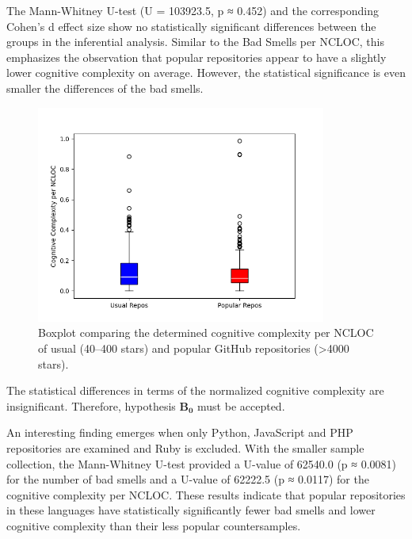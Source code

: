 \documentclass[a4paper, 12pt]{article}
\begin{document}
The Mann-Whitney U-test (U = 103923.5, p ≈ 0.452) and the corresponding Cohen's d effect size show no statistically significant differences between the groups in the inferential analysis. Similar to the Bad Smells per NCLOC, this emphasizes the observation that popular repositories appear to have a slightly lower cognitive complexity on average. However, the statistical significance is even smaller the differences of the bad smells.

\begin{figure}[h]
  \centering
  \includegraphics[width=0.85\textwidth]{./media/cmplx-boxplot.png}
  \caption{Boxplot comparing the determined cognitive complexity per NCLOC of usual (40--400 stars) and popular GitHub repositories (>4000 stars).}
  \label{fig:box-cmplx}
\end{figure}

\vspace{0.5em}
\begin{leftbar}
The statistical differences in terms of the normalized cognitive complexity are insignificant. Therefore, hypothesis $\mathbf{B_0}$ must be accepted. 
\end{leftbar}
\vspace{0.5em}

An interesting finding emerges when only Python, JavaScript and PHP repositories are examined and Ruby is excluded. With the smaller sample collection, the Mann-Whitney U-test provided a U-value of 62540.0 (p ≈ 0.0081) for the number of bad smells and a U-value of 62222.5 (p ≈ 0.0117) for the cognitive complexity per NCLOC. These results indicate that popular repositories in these languages have statistically significantly fewer bad smells and lower cognitive complexity than their less popular countersamples.\\
\end{document}
